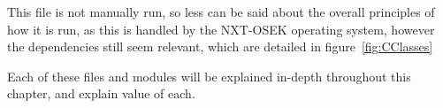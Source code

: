 This file is not manually run, so less can be said about the overall principles of how it is run, as this is handled by the NXT-OSEK operating system, however the dependencies still seem relevant, which are detailed in figure~\ref{fig:CClasses}


Each of these files and modules will be explained in-depth throughout this chapter, and explain value of each.

